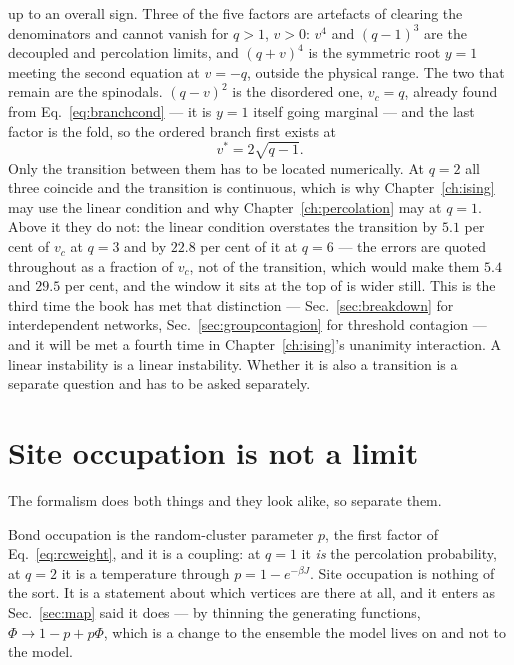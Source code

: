 up to an overall sign. Three of the five factors are artefacts of clearing the
denominators and cannot vanish for $q>1$, $v>0$: $v^{4}$ and $(q-1)^{3}$ are the
decoupled and percolation limits, and $(q+v)^{4}$ is the symmetric root $y=1$
meeting the second equation at $v=-q$, outside the physical range. The two that
remain are the spinodals. $(q-v)^{2}$ is the disordered one, $v_{c}=q$, already
found from Eq.~\eqref{eq:branchcond} --- it is $y=1$ itself going marginal ---
and the last factor is the fold, so the
ordered branch first exists at
\begin{equation}
  v^{*}=2\sqrt{q-1}.
  \label{eq:fold}
\end{equation}
Only the transition between them has to be located numerically.
At $q=2$ all three coincide and the transition is continuous, which is why
Chapter~\ref{ch:ising} may use the linear condition and why
Chapter~\ref{ch:percolation} may at $q=1$. Above it they do not: the linear
condition overstates the transition by $5.1$ per cent of $v_{c}$ at $q=3$ and by
$22.8$ per cent of it at $q=6$ --- the errors are quoted throughout as a
fraction of $v_{c}$, not of the transition, which would make them $5.4$ and
$29.5$ per cent, and the window it sits at the top of is wider still. This
is the third time the book has met that distinction --- Sec.~\ref{sec:breakdown}
for interdependent networks, Sec.~\ref{sec:groupcontagion} for threshold
contagion --- and it will be met a fourth time in
Chapter~\ref{ch:ising}'s unanimity interaction. A linear instability is a
linear instability. Whether it is also a transition is a separate question and
has to be asked separately.

\section{Site occupation is not a limit}
\label{sec:site}

The formalism does both things and they look alike, so separate them.

Bond occupation is the random-cluster parameter $p$, the first factor of
Eq.~\eqref{eq:rcweight}, and it is a coupling: at $q=1$ it \emph{is} the
percolation probability, at $q=2$ it is a temperature through
$p=1-e^{-\beta J}$. Site occupation is nothing of the sort. It is a statement
about which vertices are there at all, and it enters as
Sec.~\ref{sec:map} said it does --- by thinning the generating functions,
$\Phi\to1-p+p\Phi$, which is a change to the ensemble the model lives on and
not to the model.

